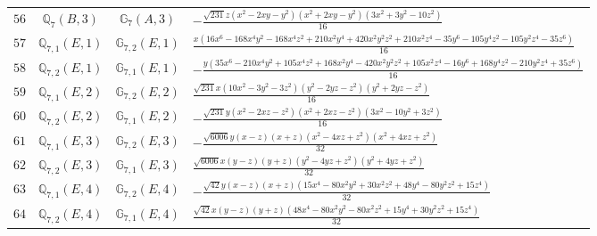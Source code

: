 \documentclass[fleqn,8pt,landscape]{jsarticle}
\begin{document}
\begin{table}[ht!]
\begin{center}
\begin{tabular}{cccl}
$ 56 $ & $ \mathbb{Q}_{7}(B,3) $ & $ \mathbb{G}_{7}(A,3) $ & $ - \frac{\sqrt{231} z \left(x^{2} - 2 x y - y^{2}\right) \left(x^{2} + 2 x y - y^{2}\right) \left(3 x^{2} + 3 y^{2} - 10 z^{2}\right)}{16} $ \\
$ 57 $ & $ \mathbb{Q}_{7,1}(E,1) $ & $ \mathbb{G}_{7,2}(E,1) $ & $ \frac{x \left(16 x^{6} - 168 x^{4} y^{2} - 168 x^{4} z^{2} + 210 x^{2} y^{4} + 420 x^{2} y^{2} z^{2} + 210 x^{2} z^{4} - 35 y^{6} - 105 y^{4} z^{2} - 105 y^{2} z^{4} - 35 z^{6}\right)}{16} $ \\
$ 58 $ & $ \mathbb{Q}_{7,2}(E,1) $ & $ \mathbb{G}_{7,1}(E,1) $ & $ - \frac{y \left(35 x^{6} - 210 x^{4} y^{2} + 105 x^{4} z^{2} + 168 x^{2} y^{4} - 420 x^{2} y^{2} z^{2} + 105 x^{2} z^{4} - 16 y^{6} + 168 y^{4} z^{2} - 210 y^{2} z^{4} + 35 z^{6}\right)}{16} $ \\
$ 59 $ & $ \mathbb{Q}_{7,1}(E,2) $ & $ \mathbb{G}_{7,2}(E,2) $ & $ \frac{\sqrt{231} x \left(10 x^{2} - 3 y^{2} - 3 z^{2}\right) \left(y^{2} - 2 y z - z^{2}\right) \left(y^{2} + 2 y z - z^{2}\right)}{16} $ \\
$ 60 $ & $ \mathbb{Q}_{7,2}(E,2) $ & $ \mathbb{G}_{7,1}(E,2) $ & $ - \frac{\sqrt{231} y \left(x^{2} - 2 x z - z^{2}\right) \left(x^{2} + 2 x z - z^{2}\right) \left(3 x^{2} - 10 y^{2} + 3 z^{2}\right)}{16} $ \\
$ 61 $ & $ \mathbb{Q}_{7,1}(E,3) $ & $ \mathbb{G}_{7,2}(E,3) $ & $ - \frac{\sqrt{6006} y \left(x - z\right) \left(x + z\right) \left(x^{2} - 4 x z + z^{2}\right) \left(x^{2} + 4 x z + z^{2}\right)}{32} $ \\
$ 62 $ & $ \mathbb{Q}_{7,2}(E,3) $ & $ \mathbb{G}_{7,1}(E,3) $ & $ \frac{\sqrt{6006} x \left(y - z\right) \left(y + z\right) \left(y^{2} - 4 y z + z^{2}\right) \left(y^{2} + 4 y z + z^{2}\right)}{32} $ \\
$ 63 $ & $ \mathbb{Q}_{7,1}(E,4) $ & $ \mathbb{G}_{7,2}(E,4) $ & $ - \frac{\sqrt{42} y \left(x - z\right) \left(x + z\right) \left(15 x^{4} - 80 x^{2} y^{2} + 30 x^{2} z^{2} + 48 y^{4} - 80 y^{2} z^{2} + 15 z^{4}\right)}{32} $ \\
$ 64 $ & $ \mathbb{Q}_{7,2}(E,4) $ & $ \mathbb{G}_{7,1}(E,4) $ & $ \frac{\sqrt{42} x \left(y - z\right) \left(y + z\right) \left(48 x^{4} - 80 x^{2} y^{2} - 80 x^{2} z^{2} + 15 y^{4} + 30 y^{2} z^{2} + 15 z^{4}\right)}{32} $ \\
 \hline \hline
\end{tabular}
\end{center}
\end{table}
\end{document}
